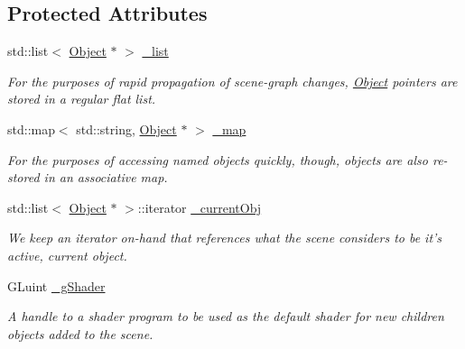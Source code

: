 \subsection*{Protected Attributes}
\begin{DoxyCompactItemize}
\item 
\hypertarget{class_scene_acdd0123ca6b2d64d8d447bb485b235fc}{std\-::list$<$ \hyperlink{class_object}{Object} $\ast$ $>$ \hyperlink{class_scene_acdd0123ca6b2d64d8d447bb485b235fc}{\-\_\-list}}\label{class_scene_acdd0123ca6b2d64d8d447bb485b235fc}

\begin{DoxyCompactList}\small\item\em For the purposes of rapid propagation of scene-\/graph changes, \hyperlink{class_object}{Object} pointers are stored in a regular flat list. \end{DoxyCompactList}\item 
std\-::map$<$ std\-::string, \hyperlink{class_object}{Object} $\ast$ $>$ \hyperlink{class_scene_a8bd5d86484a12255b26b92b6cbf8d29a}{\-\_\-map}
\begin{DoxyCompactList}\small\item\em For the purposes of accessing named objects quickly, though, objects are also re-\/stored in an associative map. \end{DoxyCompactList}\item 
\hypertarget{class_scene_ae87ca5350fcc595f3f15a4fd3c39f3d9}{std\-::list$<$ \hyperlink{class_object}{Object} $\ast$ $>$\-::iterator \hyperlink{class_scene_ae87ca5350fcc595f3f15a4fd3c39f3d9}{\-\_\-current\-Obj}}\label{class_scene_ae87ca5350fcc595f3f15a4fd3c39f3d9}

\begin{DoxyCompactList}\small\item\em We keep an iterator on-\/hand that references what the scene considers to be it's active, current object. \end{DoxyCompactList}\item 
\hypertarget{class_scene_a8f9bdd8ec5edb1f414fbd314a36e2724}{G\-Luint \hyperlink{class_scene_a8f9bdd8ec5edb1f414fbd314a36e2724}{\-\_\-g\-Shader}}\label{class_scene_a8f9bdd8ec5edb1f414fbd314a36e2724}

\begin{DoxyCompactList}\small\item\em A handle to a shader program to be used as the default shader for new children objects added to the scene. \end{DoxyCompactList}\end{DoxyCompactItemize}

